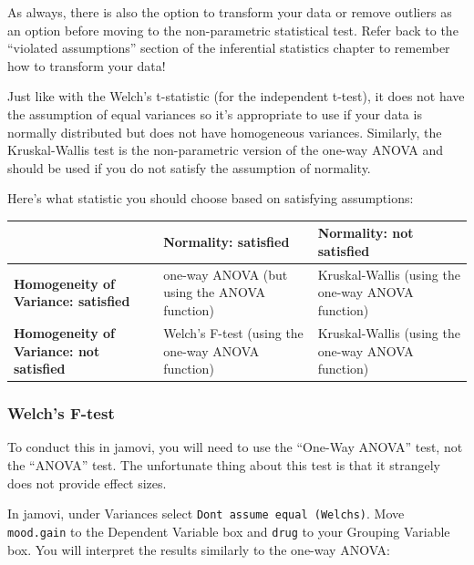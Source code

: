 \documentclass[
]{book}
\begin{document}
As always, there is also the option to transform your data or remove outliers as an option before moving to the non-parametric statistical test. Refer back to the ``violated assumptions'' section of the inferential statistics chapter to remember how to transform your data!

Just like with the Welch's t-statistic (for the independent t-test), it does not have the assumption of equal variances so it's appropriate to use if your data is normally distributed but does not have homogeneous variances. Similarly, the Kruskal-Wallis test is the non-parametric version of the one-way ANOVA and should be used if you do not satisfy the assumption of normality.

Here's what statistic you should choose based on satisfying assumptions:

\begin{longtable}[]{@{}
  >{\raggedright\arraybackslash}p{}
  >{\raggedright\arraybackslash}p{}
  >{\raggedright\arraybackslash}p{}@{}}
\toprule
& \textbf{Normality: satisfied} & \textbf{Normality: not satisfied} \\
\midrule
\endhead
\textbf{Homogeneity of Variance: satisfied} & one-way ANOVA (but using the ANOVA function) & Kruskal-Wallis (using the one-way ANOVA function) \\
\textbf{Homogeneity of Variance: not satisfied} & Welch's F-test (using the one-way ANOVA function) & Kruskal-Wallis (using the one-way ANOVA function) \\
\bottomrule
\end{longtable}

\hypertarget{welchs-f-test}{%
\subsubsection{Welch's F-test}\label{welchs-f-test}}

To conduct this in jamovi, you will need to use the ``One-Way ANOVA'' test, not the ``ANOVA'' test. The unfortunate thing about this test is that it strangely does not provide effect sizes.

In jamovi, under Variances select \texttt{Don\textquotesingle{}t\ assume\ equal\ (Welch\textquotesingle{}s)}. Move \texttt{mood.gain} to the Dependent Variable box and \texttt{drug} to your Grouping Variable box. You will interpret the results similarly to the one-way ANOVA:
\end{document}
